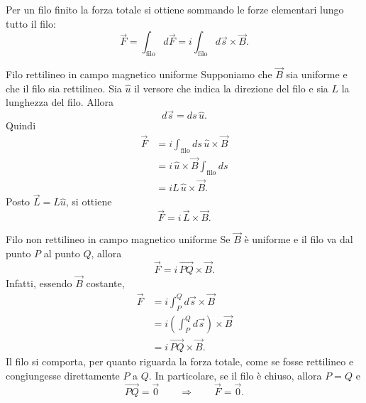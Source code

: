 \documentclass[a4paper]{article}
\begin{document}
Per un filo finito la forza totale si ottiene sommando le forze elementari lungo tutto il filo:
\[
    \vec{F}=\int_{\text{filo}}d\vec{F}=i\int_{\text{filo}}d\vec{s}\times\vec{B}.
\]

\begin{snippetexample}{Filo rettilineo in campo magnetico uniforme}
    Supponiamo che \(\vec{B}\) sia uniforme e che il filo sia rettilineo. Sia \(\hat{u}\) il versore che indica la direzione del filo e sia \(L\) la lunghezza del filo. Allora
    \[
        d\vec{s}=ds\,\hat{u}.
    \]
    Quindi
    \begin{align*}
        \vec{F}
        &=i\int_{\text{filo}}ds\,\hat{u}\times\vec{B} \\
        &=i\,\hat{u}\times\vec{B}\int_{\text{filo}}ds \\
        &=iL\,\hat{u}\times\vec{B}.
    \end{align*}
    Posto \(\vec{L}=L\hat{u}\), si ottiene
    \[
        \vec{F}=i\,\vec{L}\times\vec{B}.
    \]
\end{snippetexample}

\begin{center}
\end{center}

\begin{snippetproposition}{Filo non rettilineo in campo magnetico uniforme}
    Se \(\vec{B}\) è uniforme e il filo va dal punto \(P\) al punto \(Q\), allora
    \[
        \vec{F}=i\,\overrightarrow{PQ}\times\vec{B}.
    \]
    Infatti, essendo \(\vec{B}\) costante,
    \begin{align*}
        \vec{F}
        &=i\int_{P}^{Q}d\vec{s}\times\vec{B} \\
        &=i\left(\int_{P}^{Q}d\vec{s}\right)\times\vec{B} \\
        &=i\,\overrightarrow{PQ}\times\vec{B}.
    \end{align*}
    Il filo si comporta, per quanto riguarda la forza totale, come se fosse rettilineo e congiungesse direttamente \(P\) a \(Q\). In particolare, se il filo è chiuso, allora \(P=Q\) e
    \[
        \overrightarrow{PQ}=\vec{0}
        \qquad\Longrightarrow\qquad
        \vec{F}=\vec{0}.
    \]
\end{snippetproposition}
\end{document}

